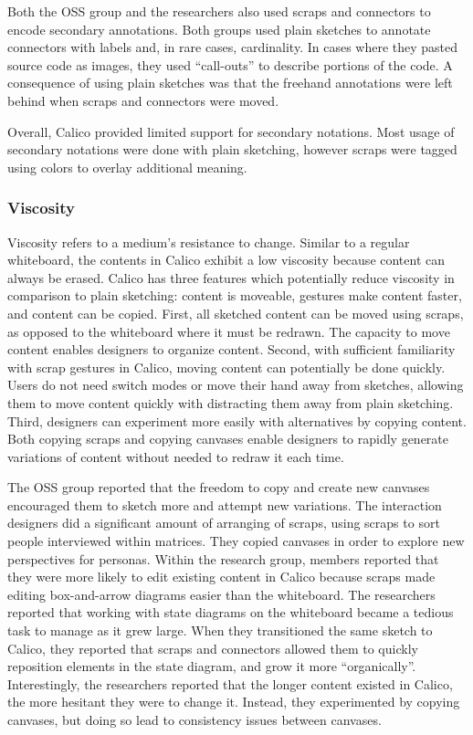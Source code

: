 Both the OSS group and the researchers also used scraps and connectors to encode secondary annotations. Both groups used plain sketches to annotate connectors with labels and, in rare cases, cardinality. In cases where they pasted source code as images, they used ``call-outs'' to describe portions of the code. A consequence of using plain sketches was that the freehand annotations were left behind when scraps and connectors were moved.

Overall, Calico provided limited support for secondary notations. Most usage of secondary notations were done with plain sketching, however scraps were tagged using colors to overlay additional meaning.


\subsubsection{Viscosity}

Viscosity refers to a medium's resistance to change. Similar to a regular whiteboard, the contents in Calico exhibit a low viscosity because content can always be erased. Calico has three features which potentially reduce viscosity in comparison to plain sketching: content is moveable, gestures make content faster, and content can be copied. First, all sketched content can be moved using scraps, as opposed to the whiteboard where it must be redrawn. The capacity to move content enables designers to organize content. Second, with sufficient familiarity with scrap gestures in Calico, moving content can potentially be done quickly. Users do not need switch modes or move their hand away from sketches, allowing them to move content quickly with distracting them away from plain sketching. Third, designers can experiment more easily with alternatives by copying content. Both copying scraps and copying canvases enable designers to rapidly generate variations of content without needed to redraw it each time.

The OSS group reported that the freedom to copy and create new canvases encouraged them to sketch more and attempt new variations. The interaction designers did a significant amount of arranging of scraps, using scraps to sort people interviewed within matrices. They copied canvases in order to explore new perspectives for personas. Within the research group, members reported that they were more likely to edit existing content in Calico because scraps made editing box-and-arrow diagrams easier than the whiteboard. The researchers reported that working with state diagrams on the whiteboard became a tedious task to manage as it grew large. When they transitioned the same sketch to Calico, they reported that scraps and connectors allowed them to quickly reposition elements in the state diagram, and grow it more ``organically''. Interestingly, the researchers reported that the longer content existed in Calico, the more hesitant they were to change it. Instead, they experimented by copying canvases, but doing so lead to consistency issues between canvases.


